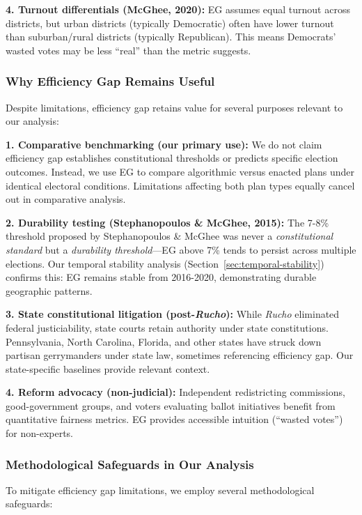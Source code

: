 \textbf{4. Turnout differentials (McGhee, 2020):}
EG assumes equal turnout across districts, but urban districts (typically Democratic) often have lower turnout than suburban/rural districts (typically Republican). This means Democrats' wasted votes may be less ``real'' than the metric suggests.

\subsubsection{Why Efficiency Gap Remains Useful}

Despite limitations, efficiency gap retains value for several purposes relevant to our analysis:

\textbf{1. Comparative benchmarking (our primary use):}
We do not claim efficiency gap establishes constitutional thresholds or predicts specific election outcomes. Instead, we use EG to compare algorithmic versus enacted plans under identical electoral conditions. Limitations affecting both plan types equally cancel out in comparative analysis.

\textbf{2. Durability testing (Stephanopoulos \& McGhee, 2015):}
The 7-8\% threshold proposed by Stephanopoulos \& McGhee was never a \emph{constitutional standard} but a \emph{durability threshold}---EG above 7\% tends to persist across multiple elections. Our temporal stability analysis (Section~\ref{sec:temporal-stability}) confirms this: EG remains stable from 2016-2020, demonstrating durable geographic patterns.

\textbf{3. State constitutional litigation (post-\emph{Rucho}):}
While \emph{Rucho} eliminated federal justiciability, state courts retain authority under state constitutions. Pennsylvania, North Carolina, Florida, and other states have struck down partisan gerrymanders under state law, sometimes referencing efficiency gap. Our state-specific baselines provide relevant context.

\textbf{4. Reform advocacy (non-judicial):}
Independent redistricting commissions, good-government groups, and voters evaluating ballot initiatives benefit from quantitative fairness metrics. EG provides accessible intuition (``wasted votes'') for non-experts.

\subsubsection{Methodological Safeguards in Our Analysis}

To mitigate efficiency gap limitations, we employ several methodological safeguards:

